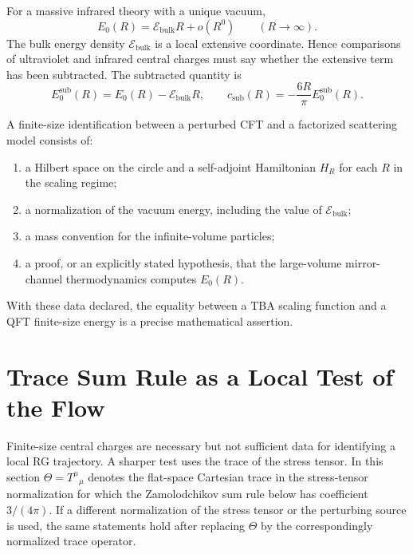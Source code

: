 For a massive infrared theory with a unique vacuum,
\[
  E_0(R)=\mathcal E_{\mathrm{bulk}}R+o(R^0)
  \qquad (R\to\infty).
\]
The bulk energy density \(\mathcal E_{\mathrm{bulk}}\) is a local extensive
coordinate.  Hence comparisons of ultraviolet and infrared central charges
must say whether the extensive term has been subtracted.  The subtracted
quantity is
\[
  E_0^{\mathrm{sub}}(R)=E_0(R)-\mathcal E_{\mathrm{bulk}}R,
  \qquad
  c_{\mathrm{sub}}(R)=-\frac{6R}{\pi}E_0^{\mathrm{sub}}(R).
\]

\begin{definition}
\label{def:finite-size-identification-data}
A finite-size identification between a perturbed CFT and a factorized
scattering model consists of:
\begin{enumerate}
\item a Hilbert space on the circle and a self-adjoint Hamiltonian \(H_R\) for
each \(R\) in the scaling regime;
\item a normalization of the vacuum energy, including the value of
\(\mathcal E_{\mathrm{bulk}}\);
\item a mass convention for the infinite-volume particles;
\item a proof, or an explicitly stated hypothesis, that the large-volume
mirror-channel thermodynamics computes \(E_0(R)\).
\end{enumerate}
With these data declared, the equality between a TBA scaling function and a
QFT finite-size energy is a precise mathematical assertion.
\end{definition}

\section{Trace Sum Rule as a Local Test of the Flow}

Finite-size central charges are necessary but not sufficient data for
identifying a local RG trajectory.  A sharper test uses the trace of the
stress tensor.  In this section \(\Theta=T^\mu{}_\mu\) denotes the flat-space
Cartesian trace in the stress-tensor normalization for which the
Zamolodchikov sum rule below has coefficient \(3/(4\pi)\).  If a different
normalization of the stress tensor or the perturbing source is used, the same
statements hold after replacing \(\Theta\) by the correspondingly normalized
trace operator.

